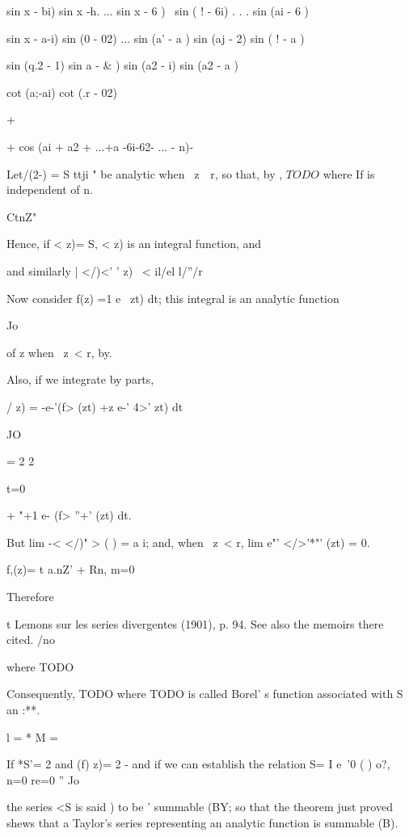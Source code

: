 {sin x - bi) sin x -h. ... sin x - 6 ) \ sin ( ! - 6i) . . . sin (ai -
6 )

sin x - a-i) sin (0 - 02) ... sin (a' - a ) sin (aj - 2)  sin ( ! -
a )

sin (q.2 - 1)    sin a - \& ) sin (a2 - i)  sin (a2 - a )

cot (a;-ai) cot (.r - 02)

+

+ cos (ai + a2 + ...+a -6i-62- ... - n)-


Let/(2-) = S ttji " be analytic when \ z\ \ r, so that, by
,
$
TODO
$
where If is independent of n.

CtnZ"

Hence, if < z)= S, < z) is an integral function, and

and similarly | </)<' ' z) \ < il/el l/''/r

Now consider f(z) =1 e~ zt) dt; this integral is an analytic function

Jo

of z when \ z\ < r, by.

Also, if we integrate by parts,

/ z) = -e-'(f> (zt) +z e-' 4>' zt) dt

JO

= 2 2

 t=0

+ "+1 e- (f> ''+' (zt) dt.

But lim -< </)" > ( ) = a i; and, when \ z\ < r, lim e"' </>'*"' (zt)
= 0.

f,(z)= t a.nZ' + Rn, m=0

Therefore

t Lemons sur les series divergentes (1901), p. 94. See also the
memoirs there cited.
%
%
/no

where TODO

Consequently, TODO
where TODO is called Borel' s function associated with S
an :**.

 l = *  M =

If *S'= 2 and (f) z)= 2 - and if we can establish the relation S= I
e~'0 ( ) o?, n=0 re=0 ''  Jo

the series <S is said ) to be ' summable (BY; so that the
theorem just proved shews that a Taylor's series representing an
analytic function is summable (B).


}
